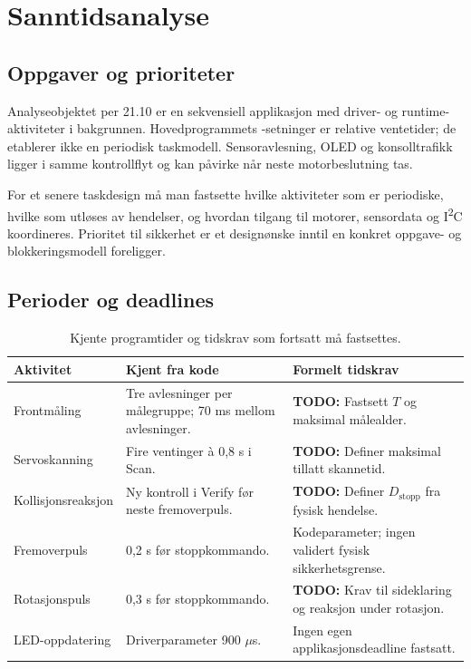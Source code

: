 \documentclass[a4paper,11pt,oneside]{report}
\newcommand{\todo}[1]{\textcolor{todocolor}{\textbf{TODO:} #1}}
\newcommand{\kode}[1]{\begingroup
 \sbox0{\texttt{\detokenize{#1}}}%
 \ifdim\wd0>150pt\relax
  {\urlstyle{tt}\expandafter\nolinkurl\expandafter{\detokenize{#1}}}%
 \else\usebox0\fi\endgroup}
\begin{document}
\chapter{Sanntidsanalyse}\label{ch:rt}
\section{Oppgaver og prioriteter}
Analyseobjektet per 21.10 er en sekvensiell applikasjon med driver- og
runtime-aktiviteter i bakgrunnen. Hovedprogrammets \kode{delay}-setninger
er relative ventetider; de etablerer ikke en periodisk taskmodell.
Sensoravlesning, OLED og konsolltrafikk ligger i samme kontrollflyt og
kan påvirke når neste motorbeslutning tas.

For et senere taskdesign må man fastsette hvilke aktiviteter som er
periodiske, hvilke som utløses av hendelser, og hvordan tilgang til motorer,
sensordata og I\textsuperscript{2}C koordineres. Prioritet til sikkerhet
er et designønske inntil en konkret oppgave- og blokkeringsmodell foreligger.

\section{Perioder og deadlines}
\begin{table}[htbp]
\small
\begin{tabularx}{\textwidth}{@{}P{30mm}YP{36mm}@{}}
\toprule Aktivitet & Kjent fra kode & Formelt tidskrav\\\midrule
Frontmåling & Tre avlesninger per målegruppe; 70 ms mellom avlesninger. & \todo{Fastsett $T$ og maksimal målealder.}\\
Servoskanning & Fire ventinger à 0,8 s i Scan. & \todo{Definer maksimal tillatt skannetid.}\\
Kollisjonsreaksjon & Ny kontroll i Verify før neste fremoverpuls. & \todo{Definer $D_{\mathrm{stopp}}$ fra fysisk hendelse.}\\
Fremoverpuls & 0,2 s før stoppkommando. & Kodeparameter; ingen validert fysisk sikkerhetsgrense.\\
Rotasjonspuls & 0,3 s før stoppkommando. & \todo{Krav til sideklaring og reaksjon under rotasjon.}\\
LED-oppdatering & Driverparameter 900 $\mu$s. & Ingen egen applikasjonsdeadline fastsatt.\\
\bottomrule
\end{tabularx}
\caption{Kjente programtider og tidskrav som fortsatt må fastsettes.}
\label{tab:tider}
\end{table}
\end{document}
